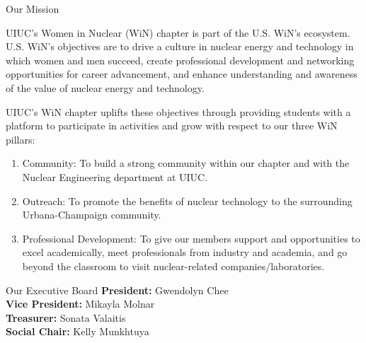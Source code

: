 \documentclass{resume2} %
\begin{document}
\begin{rSection}{Our Mission}
\raggedright
UIUC's Women in Nuclear (WiN) chapter is part of the
U.S. WiN's ecosystem. U.S. WiN's objectives are to
drive a culture in nuclear energy and technology
in which women and men succeed, create professional development
and networking opportunities for career advancement, and enhance understanding
and awareness of the value of nuclear energy and technology.

UIUC's WiN chapter uplifts these objectives through
providing students with a platform to participate
in activities and grow with respect to our three WiN
pillars:

\begin{enumerate}
	\item Community: To build a strong community within our chapter and
	with the Nuclear Engineering department at UIUC.
	\item Outreach: To promote the benefits of nuclear technology to the surrounding
	Urbana-Champaign community.
	\item Professional Development: To give our members support and opportunities to excel
	academically, meet professionals from industry and academia, and go beyond the classroom
	to visit nuclear-related companies/laboratories.
\end{enumerate}

\end{rSection}

\begin{rSection}{Our Executive Board}
	\textbf{President:} Gwendolyn Chee  \\
	\textbf{Vice President:} Mikayla Molnar \\
	\textbf{Treasurer:} Sonata Valaitis \\
	\textbf{Social Chair:} Kelly Munkhtuya
\end{rSection}
\end{document}

